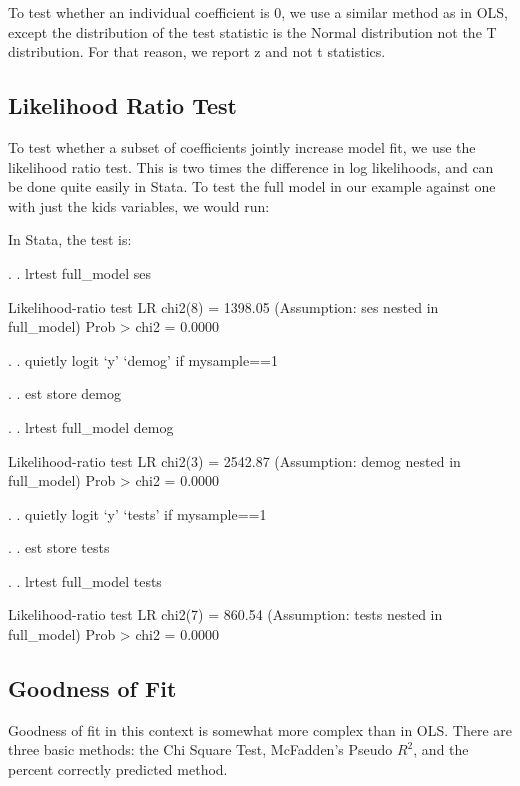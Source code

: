 \documentclass[12pt]{article}
\begin{document}
To test whether an individual coefficient is 0, we use  a similar
method as in OLS, except the distribution of the test statistic is the
Normal distribution not the T distribution. For that reason, we report
z and not t statistics. 


\subsection{Likelihood Ratio Test}

To test whether a subset of coefficients jointly increase model fit,
we use the likelihood ratio test. This is two times the difference in
log likelihoods, and can be done quite easily in Stata. To test the
full model in our example against one with just the kids variables, we
would run:


In Stata, the test is: 

\begin{stlog}


. 
. lrtest full_model ses

Likelihood-ratio test                                 LR chi2(8)  =   1398.05
(Assumption: ses nested in full_model)                Prob > chi2 =    0.0000

. 
. quietly logit `y'  `demog' if mysample==1

. 
. est store demog

. 
. lrtest full_model demog

Likelihood-ratio test                                 LR chi2(3)  =   2542.87
(Assumption: demog nested in full_model)              Prob > chi2 =    0.0000

. 
. quietly logit `y' `tests' if mysample==1

. 
. est store tests

. 
. lrtest full_model tests

Likelihood-ratio test                                 LR chi2(7)  =    860.54
(Assumption: tests nested in full_model)              Prob > chi2 =    0.0000


\end{stlog}



\subsection{Goodness of Fit}

Goodness of fit in this context is somewhat more complex than in
OLS. There are three basic methods: the Chi Square Test, McFadden's
Pseudo $R^2$, and the percent correctly predicted method.
\end{document}
